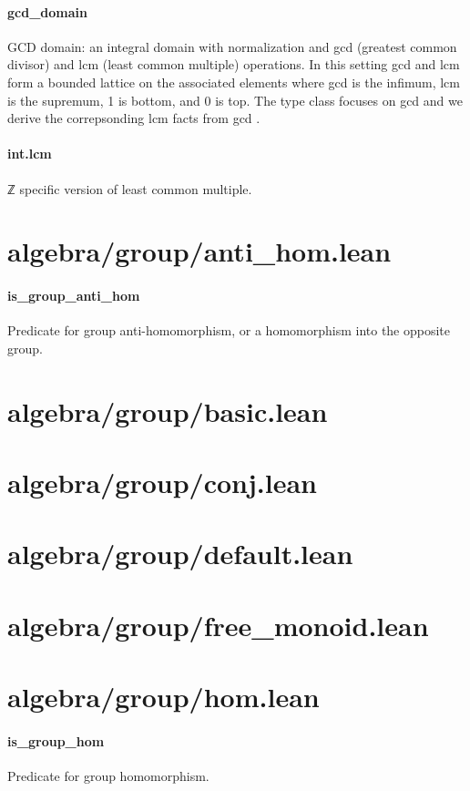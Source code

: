 \documentclass{article}
\begin{document}
\paragraph{gcd\_domain}
\par
GCD domain: an integral domain with normalization and 
\colorbox[RGB]{253,246,227}{{{{\color[RGB]{101, 123, 131} gcd }}}} (greatest common divisor) and
\colorbox[RGB]{253,246,227}{{{{\color[RGB]{101, 123, 131} lcm }}}} (least common multiple) operations. In this setting 
\colorbox[RGB]{253,246,227}{{{{\color[RGB]{101, 123, 131} gcd }}}} and 
\colorbox[RGB]{253,246,227}{{{{\color[RGB]{101, 123, 131} lcm }}}} form a bounded lattice on
the associated elements where 
\colorbox[RGB]{253,246,227}{{{{\color[RGB]{101, 123, 131} gcd }}}} is the infimum, 
\colorbox[RGB]{253,246,227}{{{{\color[RGB]{101, 123, 131} lcm }}}} is the supremum, 
\colorbox[RGB]{253,246,227}{{{{\color[RGB]{108, 113, 196} 1 }}}} is bottom, and
\colorbox[RGB]{253,246,227}{{{{\color[RGB]{108, 113, 196} 0 }}}} is top. The type class focuses on 
\colorbox[RGB]{253,246,227}{{{{\color[RGB]{101, 123, 131} gcd }}}} and we derive the correpsonding 
\colorbox[RGB]{253,246,227}{{{{\color[RGB]{101, 123, 131} lcm }}}} facts from 
\colorbox[RGB]{253,246,227}{{{{\color[RGB]{101, 123, 131} gcd }}}}.
\paragraph{int.lcm}
\par
ℤ specific version of least common multiple.
\section{algebra/group/anti\_hom.lean}\paragraph{is\_group\_anti\_hom}
\par
Predicate for group anti-homomorphism, or a homomorphism
into the opposite group.
\section{algebra/group/basic.lean}\section{algebra/group/conj.lean}\section{algebra/group/default.lean}\section{algebra/group/free\_monoid.lean}\section{algebra/group/hom.lean}\paragraph{is\_group\_hom}
\par
Predicate for group homomorphism.
\end{document}
